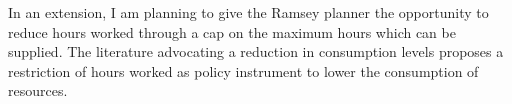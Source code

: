 

\begin{comment}
Preferences and the trade-off between leisure and consumption determining household behaviour seem to be key to the results. As argued by \cite{Boppart2019labourPerspectiveb}, the intensive margin of hours worked have been falling steadily over the last 130 years. They argue for the consistency of preferences which feature a slightly higher income effect than substitution effect. In the current model with log-utility and representative family framework,  the substitution effects offset each other. With the preferences suggested in \cite{Boppart2019labourPerspectiveb}, growth would affect hours worked, assumably changing the optimal policy. It could, for instance, be the case, that growth has to be slowed down even more, to prevent too high work efforts and consumption levels. %

content...
\end{comment}


In an extension, I am planning to give the Ramsey planner the opportunity to reduce hours worked through a cap on the maximum hours which can be supplied. The literature advocating a reduction in consumption levels \cite{Schor2005SustainableReduction} proposes a restriction of hours worked as policy instrument to lower the consumption of resources.

%

